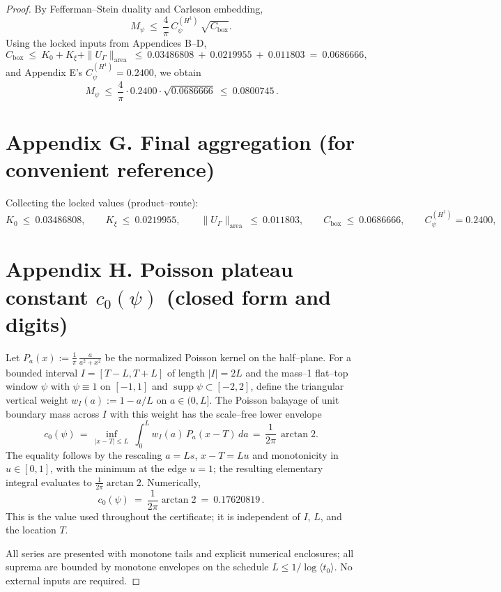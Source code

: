 \documentclass[11pt]{article}
\providecommand{\Mpsilocked}{0.0800745}%
\theoremstyle{definition}
\theoremstyle{remark}
\begin{document}
\begin{proof}
By Fefferman–Stein duality and Carleson embedding,
\[
M_\psi\ \le\ \frac{4}{\pi}\,C_\psi^{(H^1)}\,\sqrt{C_{\mathrm{box}}}.
\]
Using the locked inputs from Appendices B–D,
\[
C_{\mathrm{box}}\ \le\ K_0+K_\xi+\|U_\Gamma\|_{\mathrm{area}}
\ \le\ 0.03486808\ +\ 0.0219955\ +\ 0.011803
\ =\ 0.0686666,
\]
and Appendix E's $C_\psi^{(H^1)}=0.2400$, we obtain
\[
\boxed{\,M_\psi\ \le\ \frac{4}{\pi}\cdot 0.2400\cdot \sqrt{0.0686666}\ \le\ \Mpsilocked\,}.
\]

\section*{Appendix G. Final aggregation (for convenient reference)}

Collecting the locked values (product–route):
\[
\boxed{K_0\ \le\ 0.03486808},\qquad
\boxed{K_\xi\ \le\ 0.0219955},\qquad
\boxed{\|U_\Gamma\|_{\mathrm{area}}\ \le\ 0.011803},\qquad
\boxed{C_{\mathrm{box}}\ \le\ 0.0686666},\qquad
\boxed{C_\psi^{(H^1)}=0.2400},\qquad
\boxed{M_\psi\ \le\ \Mpsilocked}.
\]

\section*{Appendix H. Poisson plateau constant $c_0(\psi)$ (closed form and digits)}\label{app:c0-closed}
Let $P_a(x):=\tfrac{1}{\pi}\,\tfrac{a}{a^2+x^2}$ be the normalized Poisson kernel on the half--plane. For a bounded interval $I=[T{-}L,T{+}L]$ of length $|I|=2L$ and the mass--1 flat--top window $\psi$ with $\psi\equiv 1$ on $[-1,1]$ and $\operatorname{supp}\psi\subset[-2,2]$, define the triangular vertical weight $w_I(a):=1-a/L$ on $a\in(0,L]$. The Poisson balayage of unit boundary mass across $I$ with this weight has the scale--free lower envelope
\[
  c_0(\psi)
  \,=\, \inf_{|x-T|\le L}\ \int_0^{L} w_I(a)\,P_a(x{-}T)\,da
  \,=\, \frac{1}{2\pi}\,\arctan 2.
\]
The equality follows by the rescaling $a=Ls$, $x{-}T=Lu$ and monotonicity in $u\in[0,1]$, with the minimum at the edge $u=1$; the resulting elementary integral evaluates to $\tfrac{1}{2\pi}\arctan 2$. Numerically,
\[
  c_0(\psi)\ =\ \frac{1}{2\pi}\arctan 2\ =\ 0.17620819\,.
\]
This is the value used throughout the certificate; it is independent of $I$, $L$, and the location $T$.

\medskip
\noindent All series are presented with monotone tails and explicit numerical enclosures; all suprema are bounded by monotone envelopes on the schedule $L\le 1/\log\langle t_0\rangle$. No external inputs are required.


\end{proof}
\end{document}
